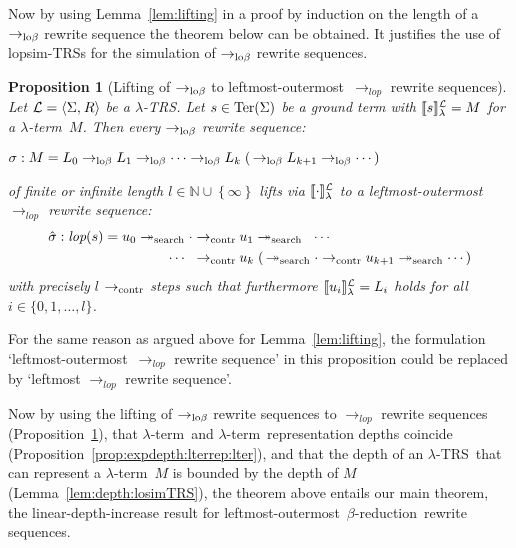 \documentclass[
submission
]{dmtcs-episciences-tampered}
\newcommand{\funin}{\mathrel{:}}
\newcommand{\fap}[2]{#1({#2})}
\newcommand{\indap}[2]{#1 _{#2}}
\newcommand{\supap}[2]{#1 ^{#2}}
\newcommand{\pap}{\supap}
\newcommand{\nb}{\nobreakdash}
\newcommand{\nf}{\normalfont}
\newcommand{\tuple}[1]{\langle #1 \rangle}
\newcommand{\tuplespace}{\hspace*{0.5pt}}
\newcommand{\pair}[2]{\tuple{#1, \tuplespace #2}}
\newcommand{\setexp}[1]{\left\{{#1}\right\}}
\newcommand{\nat}{\mathbb{N}}
\newcommand{\ater}{s}
\newcommand{\cter}{u}
\newcommand{\cteri}{\indap{\cter}}
\newcommand{\asig}{\Sigma}
\newcommand{\arules}{R}
\newcommand{\alTRS}{{\cal L}}
\newcommand{\TRS}{TRS}
\newcommand{\stermsover}{\text{\nf Ter}}
\newcommand{\termsover}{\fap{\stermsover}}
\newcommand{\slop}{\textit{lop}}\newcommand{\slopstar}{\pap{\slop}{*}}
\newcommand{\lopstart}{\fap{\slop}}
\newcommand{\denlterwrt}[2]{\llbracket{#2}\rrbracket^{#1}_{\sslabs}}
\newcommand{\lopsimTRS}{lopsim-TRS}
\newcommand{\alter}{M}
\newcommand{\clter}{L}
\newcommand{\clteri}{\indap{\clter}}
\newcommand{\sslabs}{\lambda}
\newcommand{\sred}{\to}
\newcommand{\sredi}{\indap{\sred}}
\newcommand{\smred}{\twoheadrightarrow}
\newcommand{\smredi}{\indap{\smred}}
\newcommand{\scriptsearch}{\text{\nf search}}
\newcommand{\scriptcontract}{\text{\nf contr}}
\newcommand{\ssearchmred}{\smredi{\scriptsearch}}
\newcommand{\searchmred}{\mathrel{\ssearchmred}}
\newcommand{\scontractred}{\sredi{\scriptcontract}}
\newcommand{\contractred}{\mathrel{\scontractred}}
\newcommand{\scriptlobeta}{\text{\nf lo}\beta}
\newcommand{\slobetared}{\sredi{\scriptlobeta}}
\newcommand{\lobetared}{\mathrel{\slobetared}}
\newcommand{\slopsimred}{\sredi{\slop}}
\newcommand{\arewseq}{\sigma}
\newcommand{\lambdaterm}{$\lambda$\nb-term}
\newcommand{\betareduction}{$\beta$\nb-re\-duc\-tion}
\newcommand{\lo}{left\-most-outer\-most}
\newcommand{\lTRS}{$\lambda$\hspace*{-0.5pt}\nb-\hspace*{-0.5pt}\TRS}
\theoremstyle{plain}
\newtheorem{proposition}[theorem]{Proposition}
\theoremstyle{definition}
\begin{document}
Now by using Lemma~\ref{lem:lifting} in a proof by induction on the length of a $\slobetared$ rewrite sequence 
the theorem below can be obtained. It justifies the use of \lopsimTRS{s} for the simulation of 
$\slobetared$ rewrite sequences.

\begin{proposition}[Lifting of $\slobetared$ to \lo\ $\slopsimred$ rewrite sequences]\label{prop:lifting:lobeta:lo-losim:rewseqs}
  Let $\alTRS = \pair{\asig}{\arules}$ be a \lTRS.
  Let $\ater\in\termsover{\asig}$ be a ground term with $\denlterwrt{\alTRS}{\ater} = \alter$ for a \lambdaterm~$\alter$.
  Then every $\slobetared$ rewrite sequence:
  \begin{center}
    $
    \arewseq \funin \alter = \clteri{0} \lobetared \clteri{1} \lobetared \cdots \lobetared \clteri{k} \; (\,\lobetared \clteri{k+1} \lobetared \cdots\,)
    $ 
  \end{center}
  of finite or infinite length $l\in\nat\cup\setexp{\infty}$ lifts via $\denlterwrt{\alTRS}{\cdot}$ to a \lo\ $\slopsimred$ rewrite sequence: 
\begin{align*}
    \Hat{\arewseq} \funin \lopstart{\ater} 
      = 
    \cteri{0} 
      \mathrel{\ssearchmred \cdot \scontractred} & \:
    \cteri{1} 
      \searchmred
    \;\;\cdots\;\;
    \\
    \;\;\cdots\;\;
      \contractred & \:
    \cteri{k}   
    \; (\,
      \mathrel{\ssearchmred \cdot \scontractred} 
    \cteri{k+1}
      \searchmred
    \cdots \,)  
  \end{align*}
  with precisely $l$ $\scontractred$ steps
  such that furthermore
  $\denlterwrt{\alTRS}{\cteri{i}} = \clteri{i}$ holds for all $i\in\{0,1,\ldots,l\}$.
\end{proposition}

For the same reason as argued above for Lemma~\ref{lem:lifting}, the formulation
`\lo\ $\slopsimred$ rewrite sequence' in this proposition could be replaced by `leftmost $\slopsimred$ rewrite sequence'.

Now by using the lifting of $\slobetared$ rewrite sequences to $\slopsimred$ rewrite sequences
(Proposition~\ref{prop:lifting:lobeta:lo-losim:rewseqs}),
that \lambdaterm\ and \lambdaterm\ representation depths coincide (Proposition~\ref{prop:expdepth:lterrep:lter}),
and that the depth of an \lTRS\ that can represent a \lambdaterm~$\alter$ is bounded by the depth of $\alter$ (Lemma~\ref{lem:depth:losimTRS}),
the theorem above entails our main theorem,
the linear-depth-increase result for \lo\ \betareduction\ rewrite sequences.
\end{document}
